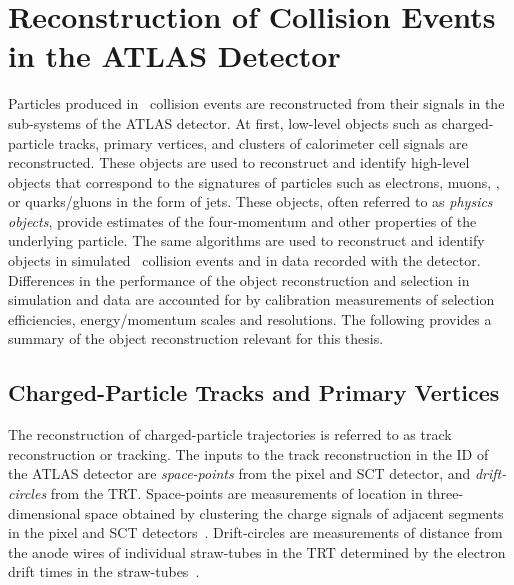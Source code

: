 \section{Reconstruction of Collision Events in the ATLAS Detector}%
\label{sec:object_reco_at_atlas}

Particles produced in \pp~collision events are reconstructed from their signals
in the sub-systems of the ATLAS detector. At first, low-level objects such as
charged-particle tracks, primary vertices, and clusters of calorimeter cell
signals are reconstructed. These objects are used to reconstruct and identify
high-level objects that correspond to the signatures of particles such as
electrons, muons, \tauleptons, or quarks/gluons in the form of jets.  These
objects, often referred to as \emph{physics objects}, provide estimates of the
four-momentum and other properties of the underlying particle. The same
algorithms are used to reconstruct and identify objects in simulated
\pp~collision events and in data recorded with the detector. Differences in the
performance of the object reconstruction and selection in simulation and data
are accounted for by calibration measurements of selection efficiencies,
energy/momentum scales and resolutions. The following provides a summary of the
object reconstruction relevant for this thesis.


\subsection{Charged-Particle Tracks and Primary Vertices}%
\label{sec:tracking_and_vertexing}


The reconstruction of charged-particle trajectories is referred to as track
reconstruction or tracking. The inputs to the track reconstruction in the ID of
the ATLAS detector are \emph{space-points} from the pixel and SCT detector, and
\emph{drift-circles} from the TRT. Space-points are measurements of location in
three-dimensional space obtained by clustering the charge signals of adjacent
segments in the pixel and SCT detectors~\cite{PERF-2015-08}. Drift-circles are
measurements of distance from the anode wires of individual straw-tubes in the
TRT determined by the electron drift times in the
straw-tubes~\cite{IDET-2015-01}.

